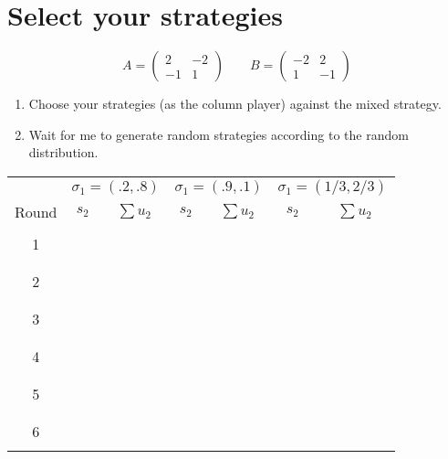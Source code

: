 \documentclass{article}
\begin{document}
\section{Select your strategies}


$$A=
\begin{pmatrix}
2 & -2\\
-1 & 1
\end{pmatrix}
\qquad
B=
\begin{pmatrix}
-2 & 2\\
1 & -1
\end{pmatrix}
$$

\begin{enumerate}
\item Choose your strategies (as the column player) against the mixed strategy.
\item Wait for me to generate random strategies according to the random distribution.
\end{enumerate}
\vspace{1cm}

\begin{center}
\begin{tabular}{c|c|c|c|c|c|c}
\toprule
& \multicolumn{2}{c|}{$\sigma_1 = (.2,.8)$} & \multicolumn{2}{|c|}{$\sigma_1 = (.9,.1)$} & \multicolumn{2}{|c}{$\sigma_1=(1/3,2/3)$}\\
Round&$s_2$&$\sum u_2$&$s_2$&$\sum u_2$&$s_2$&$\sum u_2$\\
\midrule
&&&&&&\\
1&&&&&&\\
&&&&&&\\
&&&&&&\\
2&&&&&&\\
&&&&&&\\
&&&&&&\\
3&&&&&&\\
&&&&&&\\
&&&&&&\\
4&&&&&&\\
&&&&&&\\
&&&&&&\\
5&&&&&&\\
&&&&&&\\
&&&&&&\\
6&&&&&&\\
&&&&&&\\
\bottomrule
\end{tabular}
\end{center}
\end{document}
